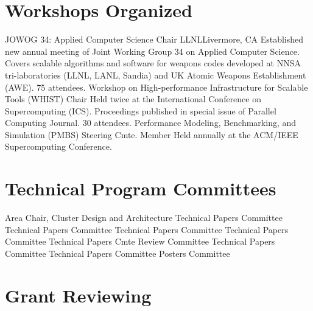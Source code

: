 \section{Workshops Organized}
		{JOWOG 34: Applied Computer Science}
		{Chair}
		{LLNL}{Livermore, CA}
		{Established new annual meeting of Joint Working Group 34 on Applied
		 Computer Science. Covers scalable algorithms and software for weapons
		 codes developed at NNSA tri-laboratories (LLNL, LANL, Sandia) and
		 UK Atomic Weapons Establishment (AWE).  75 attendees.}
		{Workshop on High-performance Infrastructure for Scalable Tools (WHIST)}
		{Chair}{}{}
		{Held twice at the International Conference on Supercomputing (ICS).
		 Proceedings published in special issue of Parallel Computing
		 Journal. 30 attendees.}
		{Performance Modeling, Benchmarking, and Simulation (PMBS)}
		{Steering Cmte. Member}{}{}
		{Held annually at the ACM/IEEE Supercomputing Conference.}

\section{Technical Program Committees}
		{Area Chair, Cluster Design and Architecture}{}{}{}
		{Technical Papers Committee}{}{}{}
		{Technical Papers Committee}{}{}{}
		{Technical Papers Committee}{}{}{}
		{Technical Papers Committee}{}{}{}
		{Technical Papers Cmte}{}{}{}
		{Review Committee}{}{}{}
		{Technical Papers Committee}{}{}{}
		{Technical Papers Committee}{}{}{}
		{Posters Committee}{}{}{}
	
\section{Grant Reviewing}

